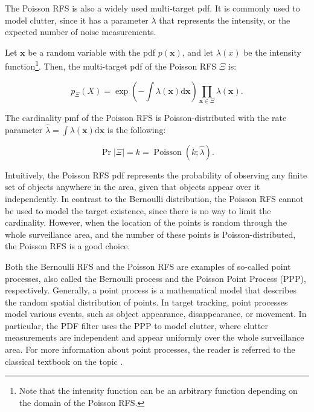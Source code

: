 The Poisson RFS is also a widely used multi-target pdf. It is commonly used to model clutter, since it has a parameter $\lambda$ that represents the intensity, or the expected number of noise measurements.

\begin{definition}
    Let $\mathbf{x}$ be a random variable with the pdf $p(\mathbf{x})$, and let $\lambda(x)$ be the intensity function\footnote{Note that the intensity function can be an arbitrary function depending on the domain of the Poisson RFS.}. Then, the multi-target pdf of the Poisson RFS $\Xi$ is:

    \begin{equation}\label{eq:poisson-rfs-pdf}
        p_\Xi(X) = \exp\left(-\int \lambda(\mathbf{x}) \mathrm{d}\mathbf{x}\right)
        \prod_{\mathbf{x} \in \Xi} \lambda(\mathbf{x}).
    \end{equation}

    The cardinality pmf of the Poisson RFS is Poisson-distributed with the rate parameter $\hat{\lambda} = \int \lambda(\mathbf{x}) \mathrm{d}\mathbf{x}$ is the following:

    \begin{equation}
        \Pr{|\Xi| = k} = \operatorname{Poisson}(k; \hat{\lambda}).
    \end{equation}
\end{definition}

Intuitively, the Poisson RFS pdf represents the probability of observing any finite set of objects anywhere in the area, given that objects appear over it independently. In contrast to the Bernoulli distribution, the Poisson RFS cannot be used to model the target existence, since there is no way to limit the cardinality. However, when the location of the points is random through the whole surveillance area, and the number of these points is Poisson-distributed, the Poisson RFS is a good choice.

Both the Bernoulli RFS and the Poisson RFS are examples of so-called point processes, also called the Bernoulli process and the Poisson Point Process (PPP), respectively. Generally, a point process is a mathematical model that describes the random spatial distribution of points. In target tracking, point processes model various events, such as object appearance, disappearance, or movement. In particular, the PDF filter uses the PPP to model clutter, where clutter measurements are independent and appear uniformly over the whole surveillance area. For more information about point processes, the reader is referred to the classical textbook on the topic \cite{streitPoissonPointProcesses2010}.

